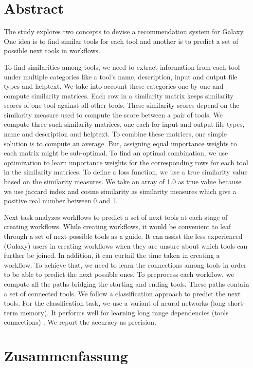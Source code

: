 \chapter*{Abstract}
The study explores two concepts to devise a recommendation system for Galaxy. One idea is to find similar tools for each tool and another is to predict a set of possible next tools in workflows.

To find similarities among tools, we need to extract information from each tool under multiple categories like a tool's name, description, input and output file types and helptext. We take into account these categories one by one and compute similarity matrices. Each row in a similarity matrix keeps similarity scores of one tool against all other tools. These similarity scores depend on the similarity measure used to compute the score between a pair of tools. We compute three such similarity matrices, one each for input and output file types, name and description and helptext. To combine these matrices, one simple solution is to compute an average. But, assigning equal importance weights to each matrix might be sub-optimal. To find an optimal combination, we use optimization to learn importance weights for the corresponding rows for each tool in the similarity matrices. To define a loss function, we use a true similarity value based on the similarity measures. We take an array of 1.0 as true value because we use jaccard index and cosine similarity as similarity measures which give a positive real number between 0 and 1.

Next task analyzes workflows to predict a set of next tools at each stage of creating workflows. While creating workflows, it would be convenient to leaf through a set of next possible tools as a guide. It can assist the less experienced (Galaxy) users in creating workflows when they are unsure about which tools can further be joined. In addition, it can curtail the time taken in creating a workflow. To achieve that, we need to learn the connections among tools in order to be able to predict the next possible ones. To preprocess each workflow, we compute all the paths bridging the starting and ending tools. These paths contain a set of connected tools. We follow a classification approach to predict the next tools. For the classification task, we use a variant of neural networks (long short-term memory). It performs well for learning long range dependencies (tools connections) \cite{LiptonKEW15, SakSB14}. We report the accuracy as precision.


\chapter*{Zusammenfassung}

